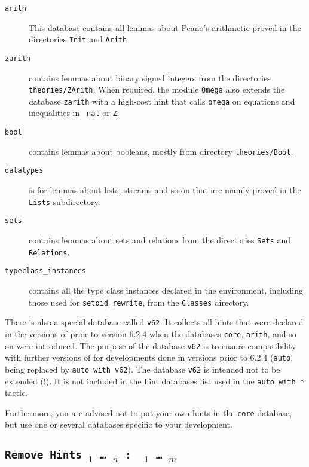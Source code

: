 \begin{coq_example*}
\begin{description}
\item[\tt arith] This database contains all lemmas about Peano's
  arithmetic proved in the directories \texttt{Init} and
  \texttt{Arith}

\item[\tt zarith] contains lemmas about binary signed integers from
  the directories \texttt{theories/ZArith}. When required, the module
  {\tt Omega} also extends the database {\tt zarith} with a high-cost
  hint that calls {\tt omega} on equations and inequalities in {\tt
  nat} or {\tt Z}.

\item[\tt bool] contains lemmas about booleans, mostly from directory
  \texttt{theories/Bool}.

\item[\tt datatypes] is for lemmas about lists, streams and so on that
  are mainly proved in the \texttt{Lists} subdirectory.

\item[\tt sets] contains lemmas about sets and relations from the
  directories \texttt{Sets} and \texttt{Relations}.

\item[\tt typeclass\_instances] contains all the type class instances
  declared in the environment, including those used for \texttt{setoid\_rewrite},
  from the \texttt{Classes} directory.
\end{description}

There is also a special database called {\tt v62}. It collects all
hints that were declared in the versions of {\Coq} prior to version
6.2.4 when the databases {\tt core}, {\tt arith}, and so on were
introduced.  The purpose of the database {\tt v62} is to ensure
compatibility with further versions of {\Coq} for developments done in
versions prior to 6.2.4 ({\tt auto} being replaced by {\tt auto with v62}).
The database {\tt v62} is intended not to be extended (!). It is not
included in the hint databases list used in the {\tt auto with *} tactic.

Furthermore, you are advised not to put your own hints in the
{\tt core} database, but use one or several databases specific to your
development.

\subsection{\tt Remove Hints \term$_1$ \mbox{\dots} \term$_n$ :~ \ident$_1$
  \mbox{\dots} \ident$_m$}
\label{RemoveHints}


\end{coq_example*}
